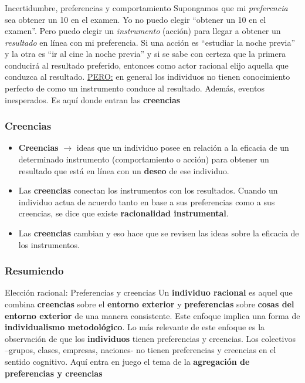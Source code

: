 \documentclass[14pt,aspectratio=169]{beamer}
\begin{document}
  \begin{frame}\frametitle{}
  \begin{block}{Incertidumbre, preferencias y comportamiento}
Supongamos que mi \textit{preferencia} sea obtener
un 10 en el examen. Yo no puedo elegir ``obtener un 10 en
el examen''. Pero puedo elegir un \textit{instrumento} (acción) para
llegar a obtener un \textit{resultado} en línea con mi preferencia. Si una acción es ``estudiar la noche
previa'' y la otra es ``ir al cine la noche previa'' y si se sabe con
certeza que la primera conducirá al resultado preferido, entonces como
actor racional elijo aquella que conduzca al resultado. \underline{PERO:} en
general los individuos no tienen conocimiento perfecto de como un
instrumento conduce al resultado. Además, eventos inesperados. Es aquí donde entran las \textbf{creencias}
    \end{block}
  \end{frame}


  
\begin{frame}\frametitle{Creencias}
  \begin{itemize}
    \item \textbf{Creencias} $\longrightarrow$ ideas que un individuo
      posee en relación a la eficacia de un determinado instrumento
      (comportamiento o acción) para obtener un resultado que está en
      línea con un \textbf{deseo} de ese individuo.
      \item Las \textbf{creencias} conectan los instrumentos con los
        resultados. Cuando un individuo actua de acuerdo tanto en base
        a sus preferencias como a sus creencias, se dice que existe
        \textbf{racionalidad instrumental}.
        \item Las \textbf{creencias} cambian y eso hace que se revisen las ideas sobre la
          eficacia de los instrumentos. 
    \end{itemize}
  \end{frame}


  \begin{frame}\frametitle{Resumiendo}
  \begin{block}{Elección racional: Preferencias y creencias}
Un \textbf{individuo racional} es aquel que combina
 \textbf{creencias} sobre el \textbf{entorno exterior} y
 \textbf{preferencias} sobre \textbf{cosas del entorno exterior} de
 una manera consistente. Este enfoque implica una forma de
 \textbf{individualismo metodológico}. Lo más relevante de este
 enfoque es la observación de que los \textbf{individuos} tienen
 preferencias y creencias. Los colectivos --grupos, clases, empresas,
 naciones- no tienen preferencias y creencias en el sentido
 cognitivo. Aquí entra en juego el tema de la \textbf{agregación de
   preferencias y creencias}    \end{block}
  \end{frame}
  
\end{document}
